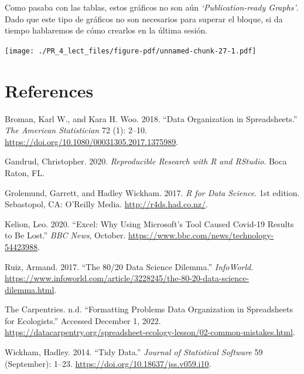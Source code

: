 \documentclass[
  letterpaper,
  DIV=11,
  numbers=noendperiod]{scrreprt}
\newlength{\cslhangindent}
\newlength{\cslentryspacingunit} %
\newenvironment{CSLReferences}[2] %
 {%
  \setlength{\parindent}{0pt}
  \ifodd #1
  \let\oldpar\par
  \def\par{\hangindent=\cslhangindent\oldpar}
  \fi
  \setlength{\parskip}{#2\cslentryspacingunit}
 }%
 {}
\begin{document}
Como pasaba con las tablas, estos gráficos no son aún
\emph{`Publication-ready Graphs'}. Dado que este tipo de gráficos no son
necesarios para superar el bloque, si da tiempo hablaremos de cómo
crearlos en la última sesión.

\texttt{[image: ./PR\_4\_lect\_files/figure-pdf/unnamed-chunk-27-1.pdf]}


\hypertarget{references}{%
\chapter*{References}\label{references}}


\hypertarget{refs}{}
\begin{CSLReferences}{1}{0}
\leavevmode{}%
Broman, Karl W., and Kara H. Woo. 2018. {``Data Organization in
Spreadsheets.''} \emph{The American Statistician} 72 (1): 2--10.
\url{https://doi.org/10.1080/00031305.2017.1375989}.

\leavevmode{}%
Gandrud, Christopher. 2020. \emph{Reproducible Research with R and
RStudio}. Boca Raton, FL.

\leavevmode{}%
Grolemund, Garrett, and Hadley Wickham. 2017. \emph{R for Data Science}.
1st edition. Sebastopol, CA: O'Reilly Media.
\url{http://r4ds.had.co.nz/}.

\leavevmode{}%
Kelion, Leo. 2020. {``Excel: Why Using Microsoft's Tool Caused Covid-19
Results to Be Lost.''} \emph{BBC News}, October.
\url{https://www.bbc.com/news/technology-54423988}.

\leavevmode{}%
Ruiz, Armand. 2017. {``The 80/20 Data Science Dilemma.''}
\emph{InfoWorld}.
\url{https://www.infoworld.com/article/3228245/the-80-20-data-science-dilemma.html}.

\leavevmode{}%
The Carpentries. n.d. {``Formatting Problems \textendash{} Data
Organization in Spreadsheets for Ecologists.''} Accessed December 1,
2022.
\url{https://datacarpentry.org/spreadsheet-ecology-lesson/02-common-mistakes.html}.

\leavevmode{}%
Wickham, Hadley. 2014. {``Tidy Data.''} \emph{Journal of Statistical
Software} 59 (September): 1--23.
\url{https://doi.org/10.18637/jss.v059.i10}.

\end{CSLReferences}
\end{document}
